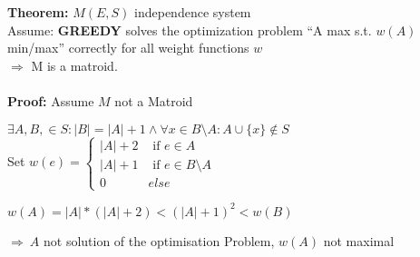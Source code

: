 \textbf{Theorem: } $M(E, S)$ independence system\\
Assume: \textbf{GREEDY} solves the optimization problem ``A max s.t. $w(A)$ min/max'' correctly for all weight functions $w$\\
$\Rightarrow$ M is a matroid.\\\\
\textbf{Proof: } Assume $M$ not a Matroid
\begin{compactenum}
	\item{
	$\exists A, B, \in S: |B| = |A| + 1 \land \forall x \in B \setminus A: A\cup \{x\} \notin S$\\
	Set $w(e) = \begin{cases} 	|A| + 2 & \text{ if } e\in A\\
								|A| + 1 & \text{ if } e \in B\setminus A\\
								0 & else
				\end{cases} $
	}
	\item{
	$w(A) = |A| * (|A| + 2) < (|A| + 1)^2 < w(B)$
	}
	\item{
	$\Rightarrow~A$ not solution of the optimisation Problem, $w(A)$ not maximal
	}
\end{compactenum}
